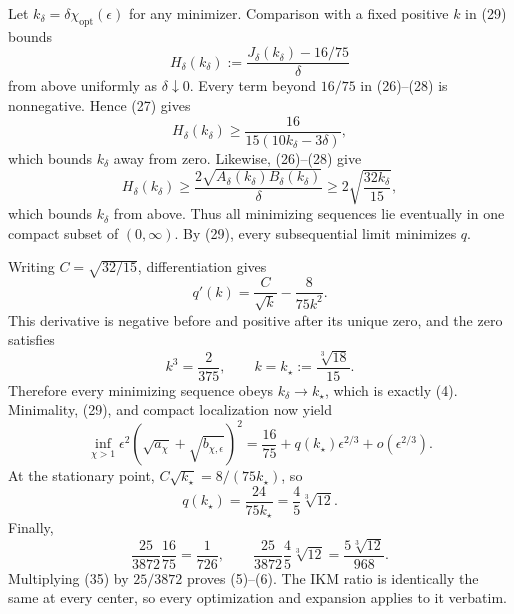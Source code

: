 Let \(k_\delta=\delta\chi_{\mathrm{opt}}(\epsilon)\) for any minimizer. Comparison with a fixed positive \(k\) in (29) bounds
\[
 H_\delta(k_\delta)
 :=\frac{J_\delta(k_\delta)-16/75}{\delta}
\]
from above uniformly as \(\delta\downarrow0\). Every term beyond \(16/75\) in (26)--(28) is nonnegative. Hence (27) gives
\[
 H_\delta(k_\delta)
 \ge \frac{16}{15(10k_\delta-3\delta)},               \tag{32}
\]
which bounds \(k_\delta\) away from zero. Likewise, (26)--(28) give
\[
 H_\delta(k_\delta)
 \ge \frac{2\sqrt{A_\delta(k_\delta)B_\delta(k_\delta)}}{\delta}
 \ge2\sqrt{\frac{32k_\delta}{15}},                   \tag{33}
\]
which bounds \(k_\delta\) from above. Thus all minimizing sequences lie eventually in one compact subset of \((0,\infty)\). By (29), every subsequential limit minimizes \(q\).

Writing \(C=\sqrt{32/15}\), differentiation gives
\[
 q'(k)=\frac{C}{\sqrt{k}}-\frac{8}{75k^2}.
\]
This derivative is negative before and positive after its unique zero, and the zero satisfies
\[
 k^3=\frac{2}{375},
 \qquad
 k=k_\star:=\frac{\sqrt[3]{18}}{15}.                  \tag{34}
\]
Therefore every minimizing sequence obeys \(k_\delta\to k_\star\), which is exactly (4). Minimality, (29), and compact localization now yield
\[
 \inf_{\chi>1}\epsilon^2
 (\sqrt{a_\chi}+\sqrt{b_{\chi,\epsilon}})^2
 =\frac{16}{75}+q(k_\star)\epsilon^{2/3}
 +o(\epsilon^{2/3}).                                  \tag{35}
\]
At the stationary point, \(C\sqrt{k_\star}=8/(75k_\star)\), so
\[
 q(k_\star)=\frac{24}{75k_\star}
 =\frac45\sqrt[3]{12}.                                \tag{36}
\]
Finally,
\[
 \frac{25}{3872}\frac{16}{75}=\frac1{726},
 \qquad
 \frac{25}{3872}\frac45\sqrt[3]{12}
 =\frac{5\sqrt[3]{12}}{968}.                          \tag{37}
\]
Multiplying (35) by \(25/3872\) proves (5)--(6). The IKM ratio is identically the same at every center, so every optimization and expansion applies to it verbatim.